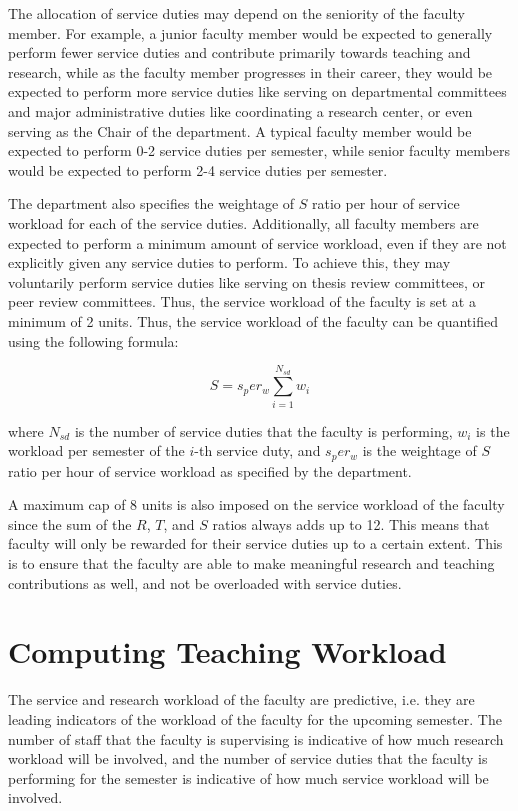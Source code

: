 The allocation of service duties may depend on the seniority of the faculty member. For example, a junior faculty member would be expected to generally perform fewer service duties and contribute primarily towards teaching and research, while as the faculty member progresses in their career, they would be expected to perform more service duties like serving on departmental committees and major administrative duties like coordinating a research center, or even serving as the Chair of the department. A typical faculty member would be expected to perform 0-2 service duties per semester, while senior faculty members would be expected to perform 2-4 service duties per semester.

The department also specifies the weightage of $S$ ratio per hour of service workload for each of the service duties. Additionally, all faculty members are expected to perform a minimum amount of service workload, even if they are not explicitly given any service duties to perform. To achieve this, they may voluntarily perform service duties like serving on thesis review committees, or peer review committees. Thus, the service workload of the faculty is set at a minimum of 2 units. Thus, the service workload of the faculty can be quantified using the following formula:

\begin{equation}
  S = s_per_w \sum_{i=1}^{N_{sd}} w_i
\end{equation}

where $N_{sd}$ is the number of service duties that the faculty is performing, $w_i$ is the workload per semester of the $i$-th service duty, and $s_per_w$ is the weightage of $S$ ratio per hour of service workload as specified by the department.

A maximum cap of 8 units is also imposed on the service workload of the faculty since the sum of the $R$, $T$, and $S$ ratios always adds up to 12. This means that faculty will only be rewarded for their service duties up to a certain extent. This is to ensure that the faculty are able to make meaningful research and teaching contributions as well, and not be overloaded with service duties.

\section{Computing Teaching Workload}
\label{sec:determining_equitable_teaching_workload}

The service and research workload of the faculty are predictive, i.e. they are leading indicators of the workload of the faculty for the upcoming semester. The number of staff that the faculty is supervising is indicative of how much research workload will be involved, and the number of service duties that the faculty is performing for the semester is indicative of how much service workload will be involved.

